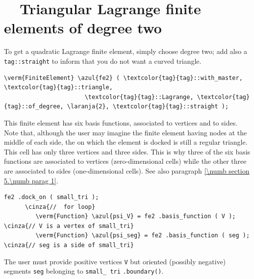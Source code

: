 \section{~~Triangular Lagrange finite elements of degree two}\label{\numb section 6.\numb parag 6}

To get a quadratic Lagrange finite element, simply choose degree two; add also a 
{\small\tt\textcolor{tag}{tag}::straight} to inform {\maniFEM} that you do not want
a curved triangle.

\begin{Verbatim}[commandchars=\\\{\},formatcom=\small\tt,frame=single,
   label=parag-\ref{\numb section 6.\numb parag 6}.cpp,rulecolor=\color{moldura},
   baselinestretch=0.94,framesep=2mm                                            ]
   \verm{FiniteElement} \azul{fe2} ( \textcolor{tag}{tag}::with_master, \textcolor{tag}{tag}::triangle,
                       \textcolor{tag}{tag}::Lagrange, \textcolor{tag}{tag}::of_degree, \laranja{2}, \textcolor{tag}{tag}::straight );
\end{Verbatim}

This finite element has six basis functions, associated to vertices and to sides.
Note that, although the user may imagine the finite element having nodes at the middle of
each side, the {\small\tt{}} on which the element is docked is still a regular triangle.
This cell has only three vertices and three sides.
This is why three of the six basis functions are associated to vertices (zero-dimensional cells)
while the other three are associated to sides (one-dimensional cells).
See also paragraph \ref{\numb section 5.\numb parag 1}.

\begin{Verbatim}[commandchars=\\\{\},formatcom=\small\tt,frame=single,
   label=parag-\ref{\numb section 6.\numb parag 6}.cpp,rulecolor=\color{moldura},
   baselinestretch=0.94,framesep=2mm                                            ]
      fe2 .dock_on ( small_tri );
      \cinza{//  for loop}  
         \verm{Function} \azul{psi_V} = fe2 .basis_function ( V );   \cinza{// V is a vertex of small_tri}
         \verm{Function} \azul{psi_seg} = fe2 .basis_function ( seg );  \cinza{// seg is a side of small_tri}
\end{Verbatim}

The user must provide positive vertices {\small\tt V} but oriented (possibly negative) segments
{\small\tt seg} belonging to {\small\tt small\_\,tri} {\small\tt .boundary()}.

